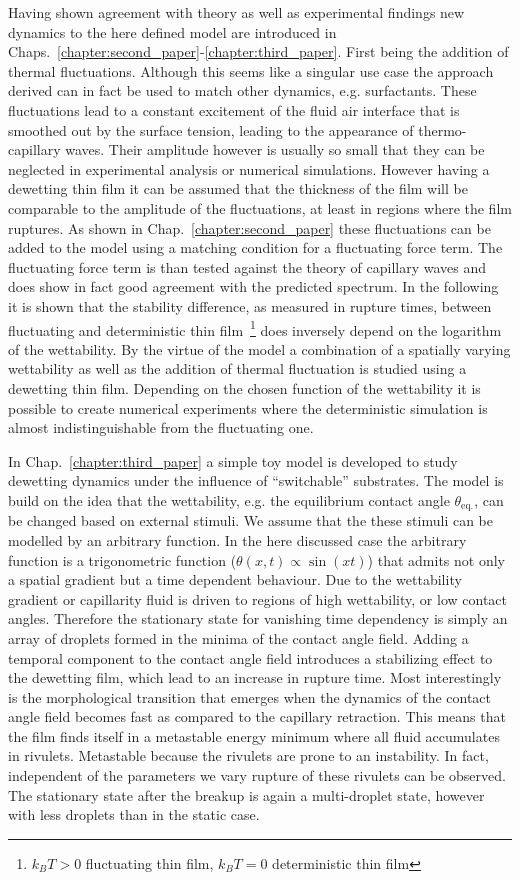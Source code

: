 Having shown agreement with theory as well as experimental findings new dynamics to the here defined model are introduced in Chaps.~\ref{chapter:second_paper}-\ref{chapter:third_paper}.  
First being the addition of thermal fluctuations.
Although this seems like a singular use case the approach derived can in fact be used to match other dynamics, e.g. surfactants.
These fluctuations lead to a constant excitement of the fluid air interface that is smoothed out by the surface tension, leading to the appearance of thermo-capillary waves.
Their amplitude however is usually so small that they can be neglected in experimental analysis or numerical simulations. 
However having a dewetting thin film it can be assumed that the thickness of the film will be comparable to the amplitude of the fluctuations, at least in regions where the film ruptures.
As shown in Chap.~\ref{chapter:second_paper} these fluctuations can be added to the model using a matching condition for a fluctuating force term. 
The fluctuating force term is than tested against the theory of capillary waves and does show in fact good agreement with the predicted spectrum.
In the following it is shown that the stability difference, as measured in rupture times, between fluctuating and deterministic thin film~\footnote{$k_BT > 0$ fluctuating thin film, $k_BT = 0$ deterministic thin film} does inversely depend on the logarithm of the wettability. 
By the virtue of the model a combination of a spatially varying wettability as well as the addition of thermal fluctuation is studied using a dewetting thin film.
Depending on the chosen function of the wettability it is possible to create numerical experiments where the deterministic simulation is almost indistinguishable from the fluctuating one.

In Chap.~\ref{chapter:third_paper} a simple toy model is developed to study dewetting dynamics under the influence of ``switchable'' substrates.
The model is build on the idea that the wettability, e.g. the equilibrium contact angle $\theta_{\text{eq.}}$, can be changed based on external stimuli. We assume that the these stimuli can be modelled by an arbitrary function.
In the here discussed case the arbitrary function is a trigonometric function ($\theta(x,t) \propto \sin(x t)$) that admits not only a spatial gradient but a time dependent behaviour.
Due to the wettability gradient or capillarity fluid is driven to regions of high wettability, or low contact angles.
Therefore the stationary state for vanishing time dependency is simply an array of droplets formed in the minima of the contact angle field.
Adding a temporal component to the contact angle field introduces a stabilizing effect to the dewetting film, which lead to an increase in rupture time.
Most interestingly is the morphological transition that emerges when the dynamics of the contact angle field becomes fast as compared to the capillary retraction.
This means that the film finds itself in a metastable energy minimum where all fluid accumulates in rivulets.
Metastable because the rivulets are prone to an instability. 
In fact, independent of the parameters we vary rupture of these rivulets can be observed. 
The stationary state after the breakup is again a multi-droplet state, however with less droplets than in the static case.

